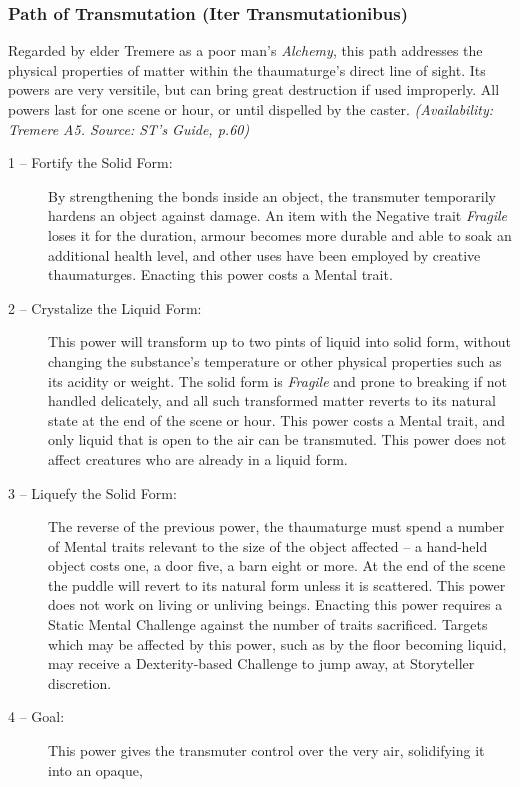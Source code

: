 \subsubsection{Path of Transmutation (Iter Transmutationibus)}
Regarded by elder Tremere as a poor man's \emph{Alchemy}, this path addresses the physical properties of matter within 
the thaumaturge's direct line of sight.  Its powers are very versitile, but can bring great destruction if used 
improperly.  All powers last for one scene or hour, or until dispelled by the caster.  \emph{(Availability:  Tremere A5.  
Source:  ST's Guide, p.60)}

\begin{description}
	\item[1 -- Fortify the Solid Form:]  By strengthening the bonds inside an object, the transmuter temporarily hardens 
	an object against damage.  An item with the Negative trait \emph{Fragile} loses it for the duration, armour becomes 
	more durable and able to soak an additional health level, and other uses have been employed by creative thaumaturges.  
	Enacting this power costs a Mental trait.
	\item[2 -- Crystalize the Liquid Form:]  This power will transform up to two pints of liquid into solid form, without 
	changing the substance's temperature or other physical properties such as its acidity or weight.  The solid form is 
	\emph{Fragile} and prone to breaking if not handled delicately, and all such transformed matter reverts to its natural 
	state at the end of the scene or hour.  This power costs a Mental trait, and only liquid that is open to the air can be 
	transmuted.  This power does not affect creatures who are already in a liquid form.
	\item[3 -- Liquefy the Solid Form:]  The reverse of the previous power, the thaumaturge must spend a number of Mental 
	traits relevant to the size of the object affected -- a hand-held object costs one, a door five, a barn eight or more.  
	At the end of the scene the puddle will revert to its natural form unless it is scattered.  This power does not work on 
	living or unliving beings.  Enacting this power requires a Static Mental Challenge against the number of traits 
	sacrificed.  Targets which may be affected by this power, such as by the floor becoming liquid, may receive a Dexterity-based 
	Challenge to jump away, at Storyteller discretion.
	\item[4 -- Goal:]  This power gives the transmuter control over the very air, solidifying it into an opaque, 

\end{description}
